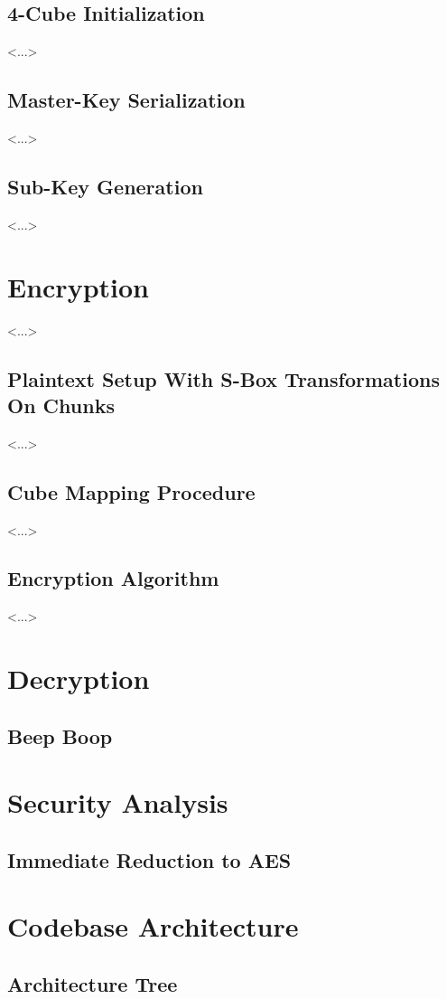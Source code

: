 \documentclass[12pt]{article}
\begin{document}
\subsection{4-Cube Initialization}
<...>

\subsection{Master-Key Serialization}
<...>

\subsection{Sub-Key Generation}
<...>

\section{Encryption}
<...>

\subsection{Plaintext Setup With S-Box Transformations On Chunks}
<...>

\subsection{Cube Mapping Procedure}
<...>

\subsection{Encryption Algorithm}
<...>

\section{Decryption}

\subsection{Beep Boop}

\section{Security Analysis}

\subsection{Immediate Reduction to AES}

\section{Codebase Architecture}

\subsection{Architecture Tree}
\end{document}
